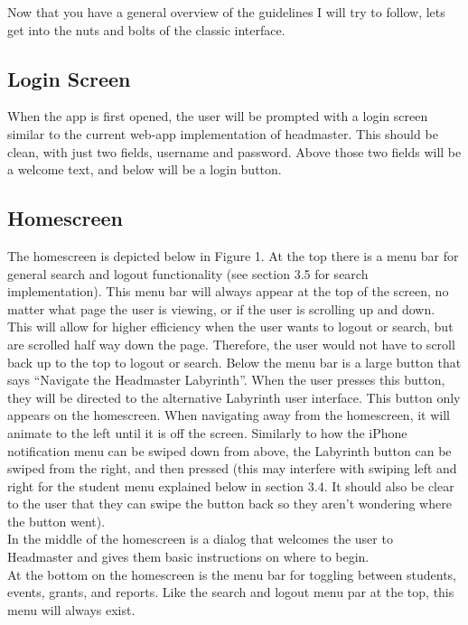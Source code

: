 \documentclass{article}
\begin{document}
Now that you have a general overview of the guidelines I will try to follow, lets get into the nuts and bolts of the classic interface.  


\subsection{Login Screen}

When the app is first opened, the user will be prompted with a login screen similar to the current web-app implementation of headmaster.  This should be clean, with just two fields, username and password.  Above those two fields will be a welcome text, and below will be a login button.

\subsection{Homescreen}

The homescreen is depicted below in Figure 1.  At the top there is a menu bar for general search and logout functionality (see section 3.5 for search implementation).  This menu bar will always appear at the top of the screen, no matter what page the user is viewing, or if the user is scrolling up and down.  This will allow for higher efficiency when the user wants to logout or search, but are scrolled half way down the page.  Therefore, the user would not have to scroll back up to the top to logout or search.  Below the menu bar is a large button that says “Navigate the Headmaster Labyrinth”.  When the user presses this button, they will be directed to the alternative Labyrinth user interface.  This button only appears on the homescreen.  When navigating away from the homescreen, it will animate to the left until it is off the screen.  Similarly to how the iPhone notification menu can be swiped down from above, the Labyrinth button can be swiped from the right, and then pressed (this may interfere with swiping left and right for the student menu explained below in section 3.4.  It should also be clear to the user that they can swipe the button back so they aren’t wondering where the button went).\\

In the middle of the homescreen is a dialog that welcomes the user to Headmaster and gives them basic instructions on where to begin.\\

At the bottom on the homescreen is the menu bar for toggling between students, events, grants, and reports.  Like the search and logout menu par at the top, this menu will always exist.
\end{document}
